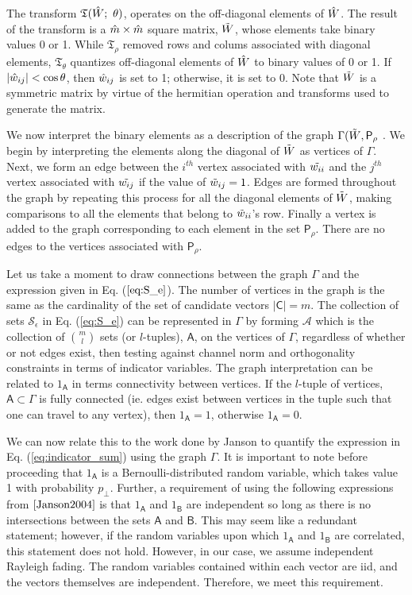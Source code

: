 The transform $\mathfrak{T}(\Hat{W};\ \theta)$, operates on the off-diagonal elements of $\Hat{W}$. The result of the transform is a $\Hat{m}\times\Hat{m}$ square matrix, $\Tilde{W}$, whose elements take binary values 0 or 1. While $\mathfrak{T}_\rho$ removed rows and colums associated with diagonal elements, $\mathfrak{T}_\theta$ quantizes off-diagonal elements of $\Hat{W}$ to binary values of 0 or 1. If $\vert \Hat{w}_{ij} \vert <\cos\theta$, then $\Hat{w}_{ij}$ is set to 1; otherwise, it is set to 0. Note that $\Tilde{W}$ is a symmetric matrix by virtue of the hermitian operation and transforms used to generate the matrix.

We now interpret the binary elements as a description of the graph $\Gamma(\Tilde{W},\mathsf{P}_\rho$ . We begin by interpreting the elements along the diagonal of $\Tilde{W}$ as vertices of $\Gamma$. Next, we form an edge between the $i^{th}$ vertex associated with $\Tilde{w_{ii}}$ and the $j^{th}$ vertex associated with $\Tilde{w_{ij}}$ if the value of $\Tilde{w}_{ij}=1$. Edges are formed throughout the graph by repeating this process for all the diagonal elements of $\Tilde{W}$, making comparisons to all the elements that belong to $\Tilde{w}_{ii}$'s row. Finally a vertex is added to the graph corresponding to each element in the set $\mathsf{P}_\rho$. There are no edges to the vertices associated with $\mathsf{P}_\rho$.

Let us take a moment to draw connections between the graph $\Gamma$ and the expression given in Eq. ($\ref{eq:S_e}$). The number of vertices in the graph is the same as the cardinality of the set of candidate vectors $\vert \mathsf{C}\vert = m$. The collection of sets $\mathscr{S}_\epsilon$ in Eq. (\ref{eq:S_e}) can be represented in $\Gamma$ by forming $\mathscr{A}$ which is the collection of $\binom{m}{l}$ sets (or $l$-tuples), $\mathsf{A}$, on the vertices of $\Gamma$, regardless of whether or not edges exist, then testing against channel norm and orthogonality constraints in terms of indicator variables. The graph interpretation can be related to $1_{\mathsf{A}}$ in terms connectivity between vertices. If the $l$-tuple of vertices, $\mathsf{A}\subset\Gamma$ is fully connected (ie. edges exist between vertices in the tuple such that one can travel to any vertex), then   $1_{\mathsf{A}} = 1$, otherwise $1_{\mathsf{A}} = 0$.

We can now relate this to the work done by Janson \cite{Janson2004} to quantify the expression in Eq. (\ref{eq:indicator_sum}) using the graph $\Gamma$. It is important to note before proceeding that $1_\mathsf{A}$ is a Bernoulli-distributed random variable, which takes value 1 with probability $p_\perp$. Further, a requirement of using the following expressions from $\cite{Janson2004}$ is that $1_\mathsf{A}$ and $1_\mathsf{B}$ are independent so long as there is no intersections between the sets $\mathsf{A}$ and $\mathsf{B}$. This may seem like a redundant statement; however, if the random variables upon which $1_\mathsf{A}$ and $1_\mathsf{B}$ are correlated, this statement does not hold. However, in our case, we assume independent Rayleigh fading. The random variables contained within each vector are iid, and the vectors themselves are independent. Therefore, we meet this requirement.

